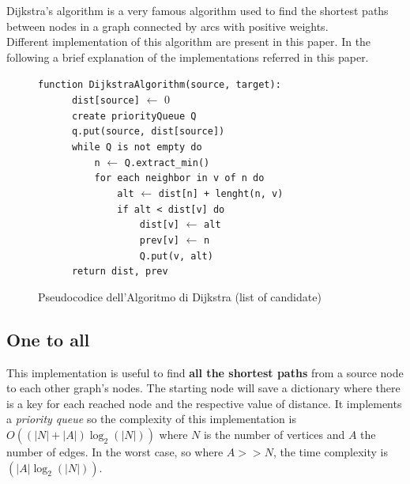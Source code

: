 \documentclass[a4paper,11pt]{report}
\begin{document}
Dijkstra's algorithm is a very famous algorithm used to find the shortest paths between nodes in a graph connected by arcs with positive weights.\\
Different implementation of this algorithm are present in this paper. In the following a brief explanation of the implementations referred in this paper.

\begin{figure}
	\verb|function DijkstraAlgorithm(source, target):|\\
	\verb|	    dist[source]| $\leftarrow$ 0\\
	\verb|	    create priorityQueue Q|\\
	\verb|	    q.put(source, dist[source])|\\
	\verb|	    while Q is not empty do|\\
	\verb|	        n| $\leftarrow$ \verb|Q.extract_min()|\\
	\verb|	        for each neighbor in v of n do|\\
	\verb|	            alt| $\leftarrow$ \verb|dist[n] + lenght(n, v)|\\
	\verb|	            if alt < dist[v] do|\\
	\verb|	                dist[v]| $\leftarrow$ \verb|alt|\\
	\verb|	                prev[v]| $\leftarrow$ \verb|n|\\
	\verb|	                Q.put(v, alt)|\\
	\verb|	    return dist, prev|\\
	
	\caption{Pseudocodice dell'Algoritmo di Dijkstra (list of candidate)}
	\label{fig:dijkstraLoC}
\end{figure}

\subsection{One to all}
This implementation is useful to find \textbf{all the shortest paths} from a source node to each other graph's nodes. The starting node will save a dictionary where there is a key for each reached node and the respective value of distance.
It implements a \textit{priority queue} so the complexity of this implementation is $O((|N|+|A|)\log_2(|N|))$ where $N$ is the number of vertices and $A$ the number of edges. In the worst case, so where $A>>N$, the time complexity is $(|A|\log_2(|N|))$.
\end{document}
